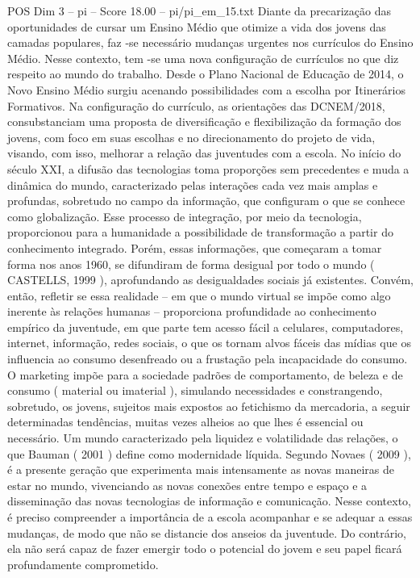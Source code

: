 \begin{textsample}{POS Dim 3 – pi – Score 18.00 – pi/pi\_em\_15.txt}
Diante da precarização das oportunidades de cursar um Ensino Médio que otimize a vida dos jovens das camadas populares, faz -se necessário mudanças urgentes nos currículos do Ensino Médio.
Nesse contexto, tem -se uma nova configuração de currículos no que diz respeito ao mundo do trabalho.
Desde o Plano Nacional de Educação de 2014, o Novo Ensino Médio surgiu acenando possibilidades com a escolha por Itinerários Formativos.
Na configuração do currículo, as orientações das DCNEM/2018, consubstanciam uma proposta de diversificação e flexibilização da formação dos jovens, com foco em suas escolhas e no direcionamento do projeto de vida, visando, com isso, melhorar a relação das juventudes com a escola.
No início do século XXI, a difusão das tecnologias toma proporções sem precedentes e muda a dinâmica do mundo, caracterizado pelas interações cada vez mais amplas e profundas, sobretudo no campo da informação, que configuram o que se conhece como globalização.
Esse processo de integração, por meio da tecnologia, proporcionou para a humanidade a possibilidade de transformação a partir do conhecimento integrado.
Porém, essas informações, que começaram a tomar forma nos anos 1960, se difundiram de forma desigual por todo o mundo ( CASTELLS, 1999 ), aprofundando as desigualdades sociais já existentes.
Convém, então, refletir se essa realidade – em que o mundo virtual se impõe como algo inerente às relações humanas – proporciona profundidade ao conhecimento empírico da juventude, em que parte tem acesso fácil a celulares, computadores, internet, informação, redes sociais, o que os tornam alvos fáceis das mídias que os influencia ao consumo desenfreado ou a frustação pela incapacidade do consumo.
O marketing impõe para a sociedade padrões de comportamento, de beleza e de consumo ( material ou imaterial ), simulando necessidades e constrangendo, sobretudo, os jovens, sujeitos mais expostos ao fetichismo da mercadoria, a seguir determinadas tendências, muitas vezes alheios ao que lhes é essencial ou necessário.
Um mundo caracterizado pela liquidez e volatilidade das relações, o que Bauman ( 2001 ) define como modernidade líquida.
Segundo Novaes ( 2009 ), é a presente geração que experimenta mais intensamente as novas maneiras de estar no mundo, vivenciando as novas conexões entre tempo e espaço e a disseminação das novas tecnologias de informação e comunicação.
Nesse contexto, é preciso compreender a importância de a escola acompanhar e se adequar a essas mudanças, de modo que não se distancie dos anseios da juventude.
Do contrário, ela não será capaz de fazer emergir todo o potencial do jovem e seu papel ficará profundamente comprometido.

\end{textsample}
